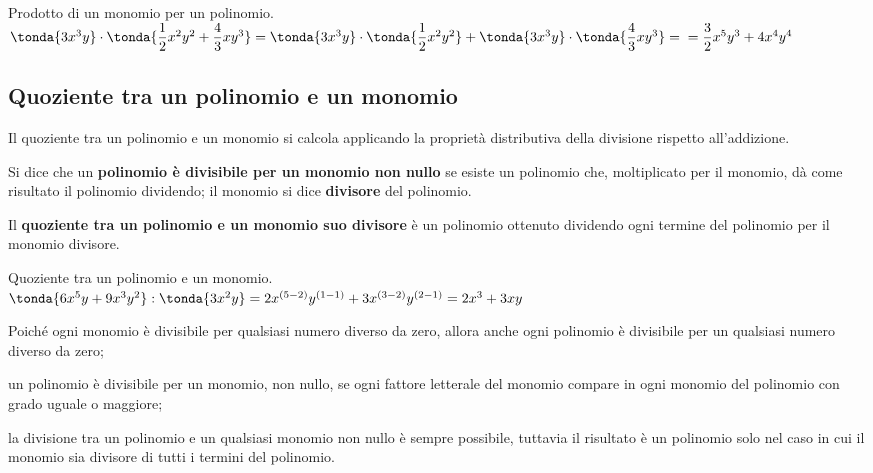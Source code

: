 \begin{esempio}{}{}
 Prodotto di un monomio per un polinomio.\\ [.5em]
\(
\tonda{3x^{3}y}\cdot\tonda{\dfrac{1}{2}x^{2}y^{2}+\dfrac{4}{3}{xy}^{3}}
=\tonda{3x^{3}y}\cdot\tonda{\dfrac{1}{2}x^{2}y^{2}}
+\tonda{3x^{3}y}\cdot\tonda{\dfrac{4}{3}{xy}^{3}} = \newline
=\dfrac{3}{2}x^{5}y^{3}+4x^{4}y^{4}
\)
\end{esempio}


\subsection{Quoziente tra un polinomio e un monomio}
\label{subsec:poli_quozientepermonomio}

Il quoziente tra un 
polinomio e un monomio si calcola applicando la
proprietà distributiva della divisione rispetto
all'addizione.

\begin{definizione}{}{}
Si dice che un \textbf{polinomio è divisibile per un monomio non
nullo} se esiste un polinomio che, moltiplicato per il monomio, dà
come risultato il polinomio dividendo; il monomio si dice
\textbf{divisore} del polinomio.
\end{definizione}

\begin{definizione}{}{}
Il \textbf{quoziente tra un polinomio e un monomio suo divisore} è un
polinomio ottenuto dividendo ogni termine del polinomio per il monomio
divisore.
\end{definizione}

\begin{esempio}{}{}
Quoziente tra un polinomio e un monomio.\\ [.5em]
\(\tonda{6x^{5}y+9x^{3}y^{2}}:\tonda{3x^{2}y} = 
2x^{(5-2)}y^{(1-1)}+3x^{(3-2)}y^{(2-1)} = 2x^{3}+3{xy}\)
\end{esempio}

\begin{osservazione}{}{}
\begin{enumeratea}
\item Poiché ogni monomio è divisibile per qualsiasi numero diverso
da zero, allora anche ogni polinomio è divisibile per un qualsiasi
numero diverso da zero;
\item un polinomio è divisibile per un monomio, non nullo, se ogni
fattore letterale del monomio compare in ogni monomio del polinomio
con grado uguale o maggiore;
\item la divisione tra un polinomio e un qualsiasi monomio non nullo è
sempre possibile, tuttavia il risultato è un polinomio solo nel caso
in cui il monomio sia divisore di tutti i termini del polinomio.
\end{enumeratea}
\end{osservazione}

